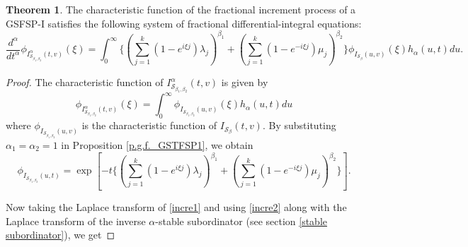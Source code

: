 \documentclass[11pt,oneside,reqno]{amsart}
\theoremstyle{definition}
\newtheorem{theorem}{\bf Theorem}[section]
\theoremstyle{remarkstyle}
\begin{document}
\begin{theorem}
    The characteristic function of the fractional increment process of a GSFSP-I satisfies the following system of fractional differential-integral equations: 
    \begin{equation*}
        \frac{d^\alpha}{dt^\alpha}\phi_{I_{\mathcal{S}_{\beta_1,\beta_2}}^{\alpha}(t,v)}(\xi)=\int_{0}^{\infty}\{(\sum_{j=1}^{k}(1-e^{i\xi j})\lambda_j)^{\beta_1} + (\sum_{j=1}^{k}(1-e^{-i\xi j})\mu_j)^{\beta_2}\}\phi_{I_{\mathcal{S}_{\beta}}(u,v)}(\xi)h_\alpha(u,t)du.
    \end{equation*}
\end{theorem}
\begin{proof}
The characteristic function of $I_{\mathcal{S}_{\beta_1,\beta_2}}^\alpha(t,v)$ is given by
\begin{equation}\label{incre1}
 \phi_{I_{\mathcal{S}_{\beta_1,\beta_2}}^{\alpha}(t,v)}(\xi)=\int_{0}^{\infty}\phi_{I_{\mathcal{S}_{\beta_1,\beta_2}}(u,v)}(\xi)h_\alpha(u,t)du
\end{equation}
where $\phi_{I_{\mathcal{S}_{\beta_1,\beta_2}}(u,v)}$ is the characteristic function of $I_{\mathcal{S}_{\beta}}(t,v)$. By substituting $\alpha_1=\alpha_2=1$ in Proposition \ref{p.g.f._GSTFSP1}, we obtain
\begin{equation}\label{incre2}
\phi_{I_{\mathcal{S}_{\beta_1,\beta_2}}(u,t)}= \exp[-t\{(\sum_{j=1}^{k}(1-e^{i\xi j})\lambda_j)^{\beta_1} + (\sum_{j=1}^{k}(1-e^{-i\xi j})\mu_j)^{\beta_2}\}].   
\end{equation}

Now taking the Laplace transform of \eqref{incre1} and using \eqref{incre2} along with the Laplace transform of the inverse $\alpha$-stable subordinator (see section \ref{stable subordinator}), we get


\end{proof}
\end{document}
